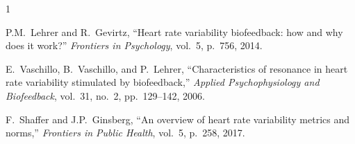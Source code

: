 \documentclass[11pt,a4paper]{article}
\begin{document}
\begin{thebibliography}{1}

P.M.\ Lehrer and R.\ Gevirtz,
``Heart rate variability biofeedback: how and why does it work?''
\textit{Frontiers in Psychology}, vol.~5, p.~756, 2014.

E.\ Vaschillo, B.\ Vaschillo, and P.\ Lehrer,
``Characteristics of resonance in heart rate variability stimulated by biofeedback,''
\textit{Applied Psychophysiology and Biofeedback}, vol.~31, no.~2, pp.~129--142, 2006.

F.\ Shaffer and J.P.\ Ginsberg,
``An overview of heart rate variability metrics and norms,''
\textit{Frontiers in Public Health}, vol.~5, p.~258, 2017.

\end{thebibliography}
\end{document}
